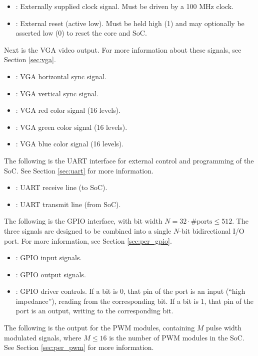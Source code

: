 \begin{itemize}
    \item {}: Externally supplied clock signal. Must be driven by a 100 MHz clock.
    \item {}: External reset (active low). Must be held high (1) and may optionally be asserted low (0) to reset the core and SoC.
\end{itemize}
Next is the VGA video output. For more information about these signals, see Section \ref{sec:vga}.
\begin{itemize}
    \item {}: VGA horizontal sync signal.
    \item {}: VGA vertical sync signal.
    \item {}: VGA red color signal (16 levels).
    \item {}: VGA green color signal (16 levels).
    \item {}: VGA blue color signal (16 levels).
\end{itemize}
The following is the UART interface for external control and programming of the SoC. See Section \ref{sec:uart} for more information.
\begin{itemize}
    \item {}: UART receive line (to SoC).
    \item {}: UART transmit line (from SoC).
\end{itemize}
The following is the GPIO interface, with bit width $N = 32 \cdot \text{\#ports} \leq 512$. The three signals are designed to be combined into a single $N$-bit bidirectional I/O port. For more information, see Section \ref{sec:per_gpio}.
\begin{itemize}
    \item {}: GPIO input signals.
    \item {}: GPIO output signals.
    \item {}: GPIO driver controls. If a bit is 0, that pin of the port is an input (``high impedance''), reading from the corresponding  bit. If a bit is 1, that pin of the port is an output, writing to the corresponding  bit.
\end{itemize}
The following is the output for the PWM modules, containing $M$ pulse width modulated signals, where $M \leq 16$ is the number of PWM modules in the SoC. See Section \ref{sec:per_pwm} for more information.

